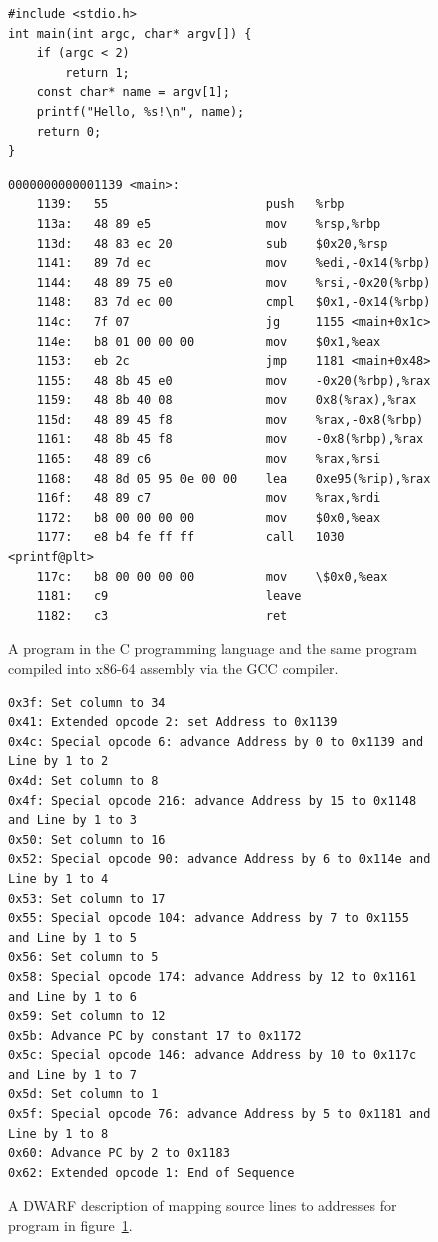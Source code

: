 \begin{figure}
    \begin{verbatim}
#include <stdio.h>
int main(int argc, char* argv[]) {
    if (argc < 2)
        return 1;
    const char* name = argv[1];
    printf("Hello, %s!\n", name);
    return 0;
}
    \end{verbatim}
    \begin{lstlisting}
0000000000001139 <main>:
    1139:	55                   	push   %rbp
    113a:	48 89 e5             	mov    %rsp,%rbp
    113d:	48 83 ec 20          	sub    $0x20,%rsp
    1141:	89 7d ec             	mov    %edi,-0x14(%rbp)
    1144:	48 89 75 e0          	mov    %rsi,-0x20(%rbp)
    1148:	83 7d ec 00          	cmpl   $0x1,-0x14(%rbp)
    114c:	7f 07                	jg     1155 <main+0x1c>
    114e:	b8 01 00 00 00       	mov    $0x1,%eax
    1153:	eb 2c                	jmp    1181 <main+0x48>
    1155:	48 8b 45 e0          	mov    -0x20(%rbp),%rax
    1159:	48 8b 40 08          	mov    0x8(%rax),%rax
    115d:	48 89 45 f8          	mov    %rax,-0x8(%rbp)
    1161:	48 8b 45 f8          	mov    -0x8(%rbp),%rax
    1165:	48 89 c6             	mov    %rax,%rsi
    1168:	48 8d 05 95 0e 00 00 	lea    0xe95(%rip),%rax
    116f:	48 89 c7             	mov    %rax,%rdi
    1172:	b8 00 00 00 00       	mov    $0x0,%eax
    1177:	e8 b4 fe ff ff       	call   1030 <printf@plt>
    117c:	b8 00 00 00 00       	mov    \$0x0,%eax
    1181:	c9                   	leave
    1182:	c3                   	ret
    \end{lstlisting}
    \caption{A program in the C programming language and the same program
    compiled into x86-64 assembly via the GCC compiler.}
    \label{fig:c-program-and-its-assembly}
\end{figure}

\begin{figure}
    \begin{lstlisting}
0x3f: Set column to 34
0x41: Extended opcode 2: set Address to 0x1139
0x4c: Special opcode 6: advance Address by 0 to 0x1139 and Line by 1 to 2
0x4d: Set column to 8
0x4f: Special opcode 216: advance Address by 15 to 0x1148 and Line by 1 to 3
0x50: Set column to 16
0x52: Special opcode 90: advance Address by 6 to 0x114e and Line by 1 to 4
0x53: Set column to 17
0x55: Special opcode 104: advance Address by 7 to 0x1155 and Line by 1 to 5
0x56: Set column to 5
0x58: Special opcode 174: advance Address by 12 to 0x1161 and Line by 1 to 6
0x59: Set column to 12
0x5b: Advance PC by constant 17 to 0x1172
0x5c: Special opcode 146: advance Address by 10 to 0x117c and Line by 1 to 7
0x5d: Set column to 1
0x5f: Special opcode 76: advance Address by 5 to 0x1181 and Line by 1 to 8
0x60: Advance PC by 2 to 0x1183
0x62: Extended opcode 1: End of Sequence
    \end{lstlisting}
    \caption{A DWARF description of mapping source lines to addresses for
    program in figure~\ref{fig:c-program-and-its-assembly}.}
    \label{fig:dwarf-locations}
\end{figure}

